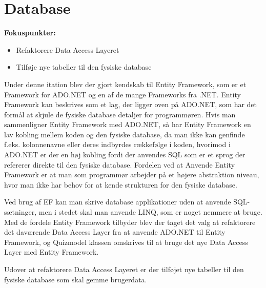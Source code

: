 \section{Database}

\textbf{Fokuspunkter:}
	\begin{itemize}
			\item Refaktorere Data Access Layeret 
			\item Tilføje nye tabeller til den fysiske database
	\end{itemize}


Under denne itation blev der gjort kendskab til Entity Framework, som er et Framework for ADO.NET og en af de mange Frameworks fra .NET. Entity Framework kan beskrives som et lag, der ligger oven på ADO.NET, som har det formål at skjule de fysiske database detaljer for programmøren. Hvis man sammenligner Entity Framework med ADO.NET, så har Entity Framework en lav kobling mellem koden og den fysiske database, da man ikke kan genfinde f.eks. kolonnenavne eller deres indbyrdes rækkefølge i koden, hvorimod i ADO.NET er der en høj kobling fordi der anvendes SQL som er et sprog der refererer direkte til den fysiske database. Fordelen ved at Anvende Entity Framework er at man som programmør arbejder på et højere abstraktion niveau, hvor man ikke har behov for at kende strukturen for den fysiske database. 

Ved brug af EF kan man skrive database applikationer uden at anvende SQL-sætninger, men i stedet skal man anvende LINQ, som er noget nemmere at bruge. Med de fordele Entity Framework tilbyder blev der taget det valg at refaktorere det daværende Data Access Layer fra at anvende ADO.NET til Entity Framework, og Quizmodel klassen omskrives til at bruge det nye Data Access Layer med Entity Framework. 

Udover at refaktorere Data Access Layeret er der tilføjet nye tabeller til den fysiske database som skal gemme brugerdata. 

